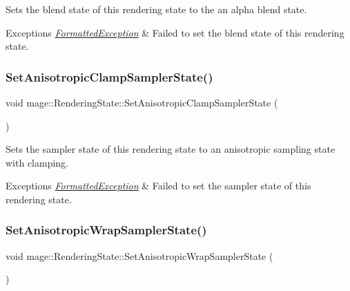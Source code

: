 Sets the blend state of this rendering state to the an alpha blend state.


\begin{DoxyExceptions}{Exceptions}
{\em \hyperlink{structmage_1_1_formatted_exception}{Formatted\+Exception}} & Failed to set the blend state of this rendering state. \\
\hline
\end{DoxyExceptions}
\hypertarget{structmage_1_1_rendering_state_a52b80c58015fb64f0b8afa7712807ccd}{}\label{structmage_1_1_rendering_state_a52b80c58015fb64f0b8afa7712807ccd} 
\subsubsection{\texorpdfstring{Set\+Anisotropic\+Clamp\+Sampler\+State()}{SetAnisotropicClampSamplerState()}}
{\footnotesize\ttfamily void mage\+::\+Rendering\+State\+::\+Set\+Anisotropic\+Clamp\+Sampler\+State (\begin{DoxyParamCaption}{ }\end{DoxyParamCaption})}

Sets the sampler state of this rendering state to an anisotropic sampling state with clamping.


\begin{DoxyExceptions}{Exceptions}
{\em \hyperlink{structmage_1_1_formatted_exception}{Formatted\+Exception}} & Failed to set the sampler state of this rendering state. \\
\hline
\end{DoxyExceptions}
\hypertarget{structmage_1_1_rendering_state_a92318b9b250555ca1d6b516d49371abc}{}\label{structmage_1_1_rendering_state_a92318b9b250555ca1d6b516d49371abc} 
\subsubsection{\texorpdfstring{Set\+Anisotropic\+Wrap\+Sampler\+State()}{SetAnisotropicWrapSamplerState()}}
{\footnotesize\ttfamily void mage\+::\+Rendering\+State\+::\+Set\+Anisotropic\+Wrap\+Sampler\+State (\begin{DoxyParamCaption}{ }\end{DoxyParamCaption})}

